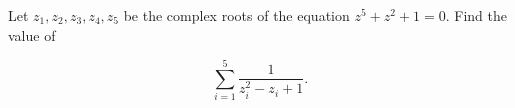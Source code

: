 Let $z_1, z_2, z_3, z_4, z_5$ be the complex roots of the equation $z^5 + z^2 + 1 = 0$. Find the value of

\[
\sum_{i=1}^{5} \dfrac{1}{z_i^2 - z_i + 1}.
\]
